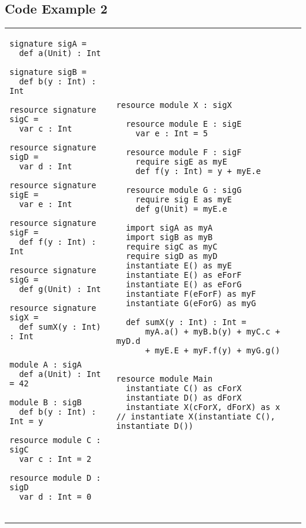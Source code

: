 \documentclass{llncs}
\begin{document}
\newpage

\subsection{Code Example 2}

\begin{tabular}{p{}p{}}
\begin{minipage}[t]{\textwidth}
\begin{lstlisting}
signature sigA = 
  def a(Unit) : Int

signature sigB =
  def b(y : Int) : Int

resource signature sigC =
  var c : Int

resource signature sigD =
  var d : Int

resource signature sigE =
  var e : Int
  
resource signature sigF =
  def f(y : Int) : Int
  
resource signature sigG =
  def g(Unit) : Int

resource signature sigX =
  def sumX(y : Int) : Int


module A : sigA
  def a(Unit) : Int = 42

module B : sigB
  def b(y : Int) : Int = y

resource module C : sigC
  var c : Int = 2

resource module D : sigD
  var d : Int = 0
  
\end{lstlisting}
\end{minipage}
&
\hspace{-10ex}
\begin{minipage}[t]{\textwidth}
\begin{lstlisting}
resource module X : sigX

  resource module E : sigE
    var e : Int = 5

  resource module F : sigF
    require sigE as myE
    def f(y : Int) = y + myE.e

  resource module G : sigG
    require sig E as myE
    def g(Unit) = myE.e

  import sigA as myA
  import sigB as myB
  require sigC as myC
  require sigD as myD
  instantiate E() as myE
  instantiate E() as eForF
  instantiate E() as eForG
  instantiate F(eForF) as myF
  instantiate G(eForG) as myG

  def sumX(y : Int) : Int = 
      myA.a() + myB.b(y) + myC.c + myD.d
      + myE.E + myF.f(y) + myG.g()


resource module Main
  instantiate C() as cForX
  instantiate D() as dForX
  instantiate X(cForX, dForX) as x
// instantiate X(instantiate C(), instantiate D())



\end{lstlisting}
\end{minipage}
\end{tabular}
\end{document}
